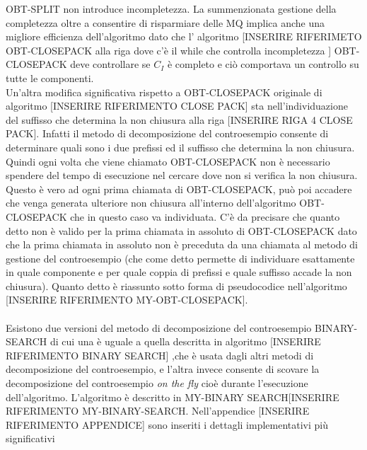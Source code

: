 OBT-SPLIT non introduce incompletezza. La summenzionata gestione della completezza oltre a consentire di risparmiare delle \ac{MQ}  implica anche una migliore efficienza dell'algoritmo dato che l' algoritmo [INSERIRE RIFERIMETO OBT-CLOSEPACK alla riga dove c'è il while che controlla incompletezza ] OBT-CLOSEPACK deve controllare se $C_I$ è completo e ciò comportava un controllo su tutte le componenti.\\
Un'altra modifica significativa rispetto a OBT-CLOSEPACK originale di algoritmo [INSERIRE RIFERIMENTO CLOSE PACK] sta nell'individuazione del suffisso che determina la non chiusura alla riga [INSERIRE RIGA 4 CLOSE PACK]. Infatti il metodo di decomposizione del controesempio consente di determinare quali sono i due prefissi ed il suffisso che determina la non chiusura. Quindi ogni volta che viene chiamato OBT-CLOSEPACK non è necessario spendere del tempo di esecuzione nel cercare dove non si verifica la non chiusura. Questo è vero ad ogni prima chiamata di OBT-CLOSEPACK, può poi accadere che venga generata ulteriore non chiusura all'interno dell'algoritmo OBT-CLOSEPACK che in questo caso va individuata. C'è da precisare che quanto detto non è valido per la prima chiamata in assoluto di OBT-CLOSEPACK dato che la prima chiamata in assoluto non è preceduta da una chiamata al metodo di gestione del controesempio (che come detto permette di individuare esattamente in quale componente e per quale coppia di prefissi e quale suffisso accade la non chiusura).  Quanto detto è riassunto sotto forma di pseudocodice nell'algoritmo [INSERIRE RIFERIMENTO MY-OBT-CLOSEPACK].\\\\
Esistono due versioni del metodo di decomposizione del controesempio BINARY-SEARCH di cui una è uguale a quella descritta in algoritmo [INSERIRE RIFERIMENTO BINARY SEARCH] ,che è usata dagli altri metodi di decomposizione del controesempio, e l'altra  invece consente di scovare la decomposizione del controesempio \textit{on the fly} cioè durante l'esecuzione dell'algoritmo. L'algoritmo è descritto in MY-BINARY SEARCH[INSERIRE RIFERIMENTO MY-BINARY-SEARCH.
Nell'appendice [INSERIRE RIFERIMENTO APPENDICE] sono inseriti i dettagli implementativi più significativi    